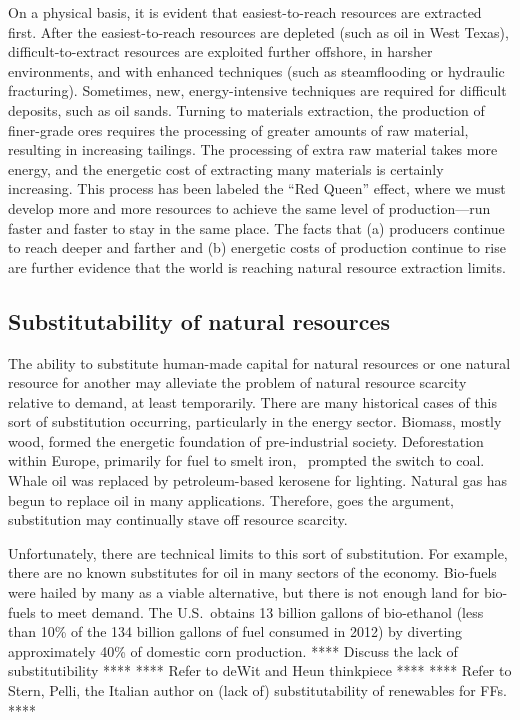 On a physical basis, 
it is evident that easiest-to-reach resources are extracted first. 
After the easiest-to-reach resources are depleted (such as oil in West Texas),
difficult-to-extract resources are exploited
further offshore,
in harsher environments, and
with enhanced techniques (such as steamflooding or hydraulic fracturing).
Sometimes, new, energy-intensive techniques are required 
for difficult deposits, such as oil sands.
Turning to materials extraction, the production of finer-grade ores
requires the processing of greater amounts of raw material, 
resulting in increasing tailings.
The processing of extra raw material takes more energy, and 
the energetic cost of extracting many materials is certainly increasing.\cite{Hall1986, Mudd2010,Hall2011}
This process has been labeled the ``Red Queen'' effect, 
where we must develop more and more resources to achieve the same
level of production---run faster and faster to stay in 
the same place.\cite{Lees1975, Ross1988, Murray2013, Murphy2014}
The facts that (a) producers continue to reach deeper and farther 
and (b) energetic costs of production continue to rise
are further evidence that the world is reaching natural resource extraction limits.


\subsection{Substitutability of natural resources}

The ability to substitute human-made capital for natural resources
or one natural resource for another 
may alleviate the problem of natural resource scarcity relative to demand,
at least temporarily.
There are many historical cases of this sort of substitution occurring,
particularly in the energy sector.
Biomass, mostly wood,
formed the energetic foundation of pre-industrial society.
Deforestation within Europe,
primarily for fuel to smelt iron,~\cite{Smil1994}
prompted the switch to coal.
Whale oil was replaced by petroleum-based kerosene for lighting.\cite{Weissenbacher2009}
Natural gas has begun to replace oil in many applications.
Therefore, goes the argument, 
substitution may continually stave off resource scarcity.

Unfortunately, there are technical limits to this sort of substitution.
For example, there are no known substitutes for oil 
in many sectors of the economy.\cite{Hirsch2005}
Bio-fuels were hailed by many as a viable alternative,
but there is not enough land for bio-fuels to meet demand.
The U.S.\ obtains 13 billion gallons of bio-ethanol 
(less than 10\% of the 134 billion gallons of fuel consumed in 2012)
by diverting approximately 40\%
of domestic corn production.\cite{EIA2014, USDA2014}
**** Discuss the lack of substitutibility **** 
**** Refer to deWit and Heun thinkpiece ****
**** Refer to Stern, Pelli, the Italian author on (lack of) 
substitutability of renewables for FFs. ****

